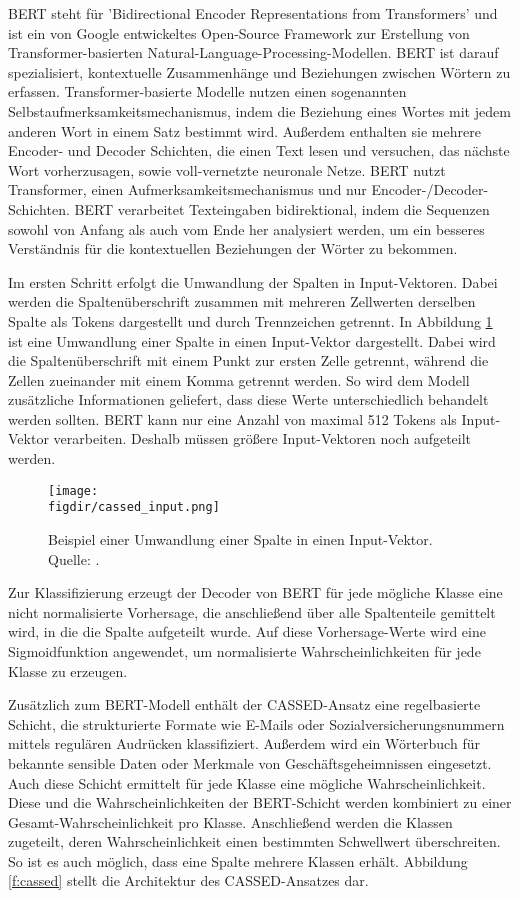 BERT steht für 'Bidirectional Encoder Representations from Transformers' und ist ein von Google entwickeltes Open-Source Framework zur Erstellung von Transformer-basierten Natural-Language-Processing-Modellen. BERT ist darauf spezialisiert, kontextuelle Zusammenhänge und Beziehungen zwischen Wörtern zu erfassen. Transformer-basierte Modelle nutzen einen sogenannten Selbstaufmerksamkeitsmechanismus, indem die Beziehung eines Wortes mit jedem anderen Wort in einem Satz bestimmt wird. Außerdem enthalten sie mehrere Encoder- und Decoder Schichten, die einen Text lesen und versuchen, das nächste Wort vorherzusagen, sowie voll-vernetzte neuronale Netze. BERT nutzt Transformer, einen Aufmerksamkeitsmechanismus und nur Encoder-/Decoder-Schichten. BERT verarbeitet Texteingaben bidirektional, indem die Sequenzen sowohl von Anfang als auch vom Ende her analysiert werden, um ein besseres Verständnis für die kontextuellen Beziehungen der Wörter zu bekommen.

Im ersten Schritt erfolgt die Umwandlung der Spalten in Input-Vektoren. Dabei werden die Spaltenüberschrift zusammen mit mehreren Zellwerten derselben Spalte als Tokens dargestellt und durch Trennzeichen getrennt. In Abbildung \ref{f:input} ist eine Umwandlung einer Spalte in einen Input-Vektor dargestellt. Dabei wird die Spaltenüberschrift mit einem Punkt zur ersten Zelle getrennt, während die Zellen zueinander mit einem Komma getrennt werden. So wird dem Modell zusätzliche Informationen geliefert, dass diese Werte unterschiedlich behandelt werden sollten. BERT kann nur eine Anzahl von maximal 512 Tokens als Input-Vektor verarbeiten. Deshalb müssen größere Input-Vektoren noch aufgeteilt werden.

\begin{figure}[htbp]
  \centering
  \texttt{[image: \\figdir/cassed\_input.png]}
  \caption{Beispiel einer Umwandlung einer Spalte in einen Input-Vektor. Quelle: \cite{Kuzina.2023}.}
  \label{f:input}
\end{figure}

Zur Klassifizierung erzeugt der Decoder von BERT für jede mögliche Klasse eine nicht normalisierte Vorhersage, die anschließend über alle Spaltenteile gemittelt wird, in die die Spalte aufgeteilt wurde. Auf diese Vorhersage-Werte wird eine Sigmoidfunktion angewendet, um normalisierte Wahrscheinlichkeiten für jede Klasse zu erzeugen.

Zusätzlich zum BERT-Modell enthält der CASSED-Ansatz eine regelbasierte Schicht, die strukturierte Formate wie E-Mails oder Sozialversicherungsnummern mittels regulären Audrücken klassifiziert. Außerdem wird ein Wörterbuch für bekannte sensible Daten oder Merkmale von Geschäftsgeheimnissen eingesetzt. Auch diese Schicht ermittelt für jede Klasse eine mögliche Wahrscheinlichkeit. Diese und die Wahrscheinlichkeiten der BERT-Schicht werden kombiniert zu einer Gesamt-Wahrscheinlichkeit pro Klasse. Anschließend werden die Klassen zugeteilt, deren Wahrscheinlichkeit einen bestimmten Schwellwert überschreiten. So ist es auch möglich, dass eine Spalte mehrere Klassen erhält. Abbildung \ref{f:cassed} stellt die Architektur des CASSED-Ansatzes dar.

